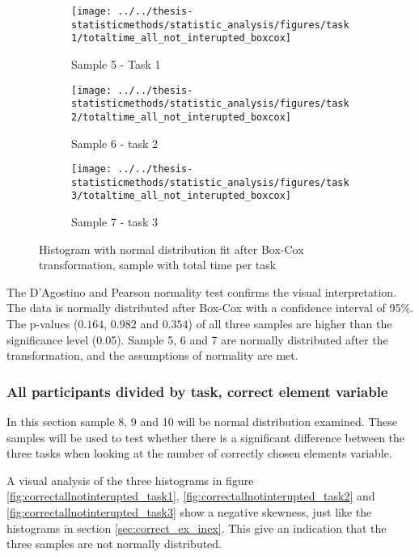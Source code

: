 \begin{figure}[h!]
	\centering
	\begin{subfigure}[b]{0.3\textwidth}
		\centering
		\texttt{[image: ../../thesis-statisticmethods/statistic\_analysis/figures/task1/totaltime\_all\_not\_interupted\_boxcox]}
		\caption{Sample 5 - Task 1}
		\label{fig:totaltimeallnotinteruptedboxcox_task1}
	\end{subfigure}
	\begin{subfigure}[b]{0.3\textwidth}
		\centering
		\texttt{[image: ../../thesis-statisticmethods/statistic\_analysis/figures/task2/totaltime\_all\_not\_interupted\_boxcox]}
		\caption{Sample 6 - task 2}
		\label{fig:totaltimeallnotinteruptedboxcox_task2}
	\end{subfigure}
	\begin{subfigure}[b]{0.3\textwidth}
		\centering
		\texttt{[image: ../../thesis-statisticmethods/statistic\_analysis/figures/task3/totaltime\_all\_not\_interupted\_boxcox]}
		\caption{Sample 7 - task 3}
		\label{fig:totaltimeallnotinteruptedboxcox_task3}
	\end{subfigure}
	\caption{Histogram with normal distribution fit after Box-Cox transformation, sample with total time per task}
\end{figure}

The D'Agostino and Pearson normality test confirms the visual interpretation. The data is normally distributed after Box-Cox with a confidence interval of 95\%. The p-values ($0.164$, $0.982$ and $0.354$) of all three samples are higher than the significance level (0.05). Sample 5, 6 and 7 are normally distributed after the transformation, and the assumptions of normality are met. 
 
 \subsubsection[Sample 8, 9 and 10]{All participants divided by task,  correct element variable}\label{sec:task123_correct_normaltest}
 In this section sample 8, 9 and 10 will be normal distribution examined. These samples will be used to test whether there is a significant difference between the three tasks when looking at the number of correctly chosen elements variable. 

A visual analysis of the three histograms in figure \ref{fig:correctallnotinterupted_task1}, \ref{fig:correctallnotinterupted_task2} and \ref{fig:correctallnotinterupted_task3} show a negative skewness, just like the histograms in section \ref{sec:correct_ex_inex}. This give an indication that the three samples are not normally distributed.
 
